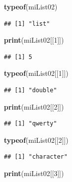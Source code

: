 \documentclass[
]{book}
\newenvironment{Shaded}{\begin{snugshade}}{\end{snugshade}}
\newcommand{\DecValTok}[1]{\textcolor[rgb]{0.00,0.00,0.81}{#1}}
\newcommand{\KeywordTok}[1]{\textcolor[rgb]{0.13,0.29,0.53}{\textbf{#1}}}
\newcommand{\NormalTok}[1]{#1}
\begin{document}
\begin{Shaded}
\begin{Highlighting}[]
\KeywordTok{typeof}\NormalTok{(miList02)}
\end{Highlighting}
\end{Shaded}

\begin{verbatim}
## [1] "list"
\end{verbatim}

\begin{Shaded}
\begin{Highlighting}[]
\KeywordTok{print}\NormalTok{(miList02[[}\DecValTok{1}\NormalTok{]])}
\end{Highlighting}
\end{Shaded}

\begin{verbatim}
## [1] 5
\end{verbatim}

\begin{Shaded}
\begin{Highlighting}[]
\KeywordTok{typeof}\NormalTok{(miList02[[}\DecValTok{1}\NormalTok{]])}
\end{Highlighting}
\end{Shaded}

\begin{verbatim}
## [1] "double"
\end{verbatim}

\begin{Shaded}
\begin{Highlighting}[]
\KeywordTok{print}\NormalTok{(miList02[[}\DecValTok{2}\NormalTok{]])}
\end{Highlighting}
\end{Shaded}

\begin{verbatim}
## [1] "qwerty"
\end{verbatim}

\begin{Shaded}
\begin{Highlighting}[]
\KeywordTok{typeof}\NormalTok{(miList02[[}\DecValTok{2}\NormalTok{]])}
\end{Highlighting}
\end{Shaded}

\begin{verbatim}
## [1] "character"
\end{verbatim}

\begin{Shaded}
\begin{Highlighting}[]
\KeywordTok{print}\NormalTok{(miList02[[}\DecValTok{3}\NormalTok{]])}
\end{Highlighting}
\end{Shaded}
\end{document}
